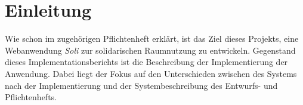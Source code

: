 
\chapter{Einleitung}
\label{ch:preface}




Wie schon im zugehörigen Pflichtenheft erklärt, ist das Ziel dieses Projekts, eine Webanwendung \textit{Soli} zur solidarischen Raumnutzung zu entwickeln.
Gegenstand dieses Implementationsberichts ist die Beschreibung der Implementierung der Anwendung.
Dabei liegt der Fokus auf den Unterschieden zwischen des Systems nach der Implementierung und der Systembeschreibung des Entwurfs- und Pflichtenhefts.